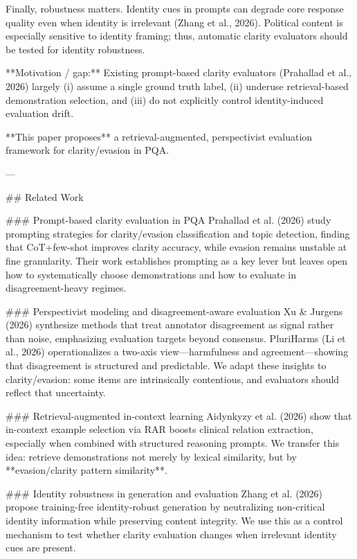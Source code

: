 Finally, robustness matters. Identity cues in prompts can degrade core response quality even when identity is irrelevant (Zhang et al., 2026). Political content is especially sensitive to identity framing; thus, automatic clarity evaluators should be tested for identity robustness.

**Motivation / gap:** Existing prompt-based clarity evaluators (Prahallad et al., 2026) largely (i) assume a single ground truth label, (ii) underuse retrieval-based demonstration selection, and (iii) do not explicitly control identity-induced evaluation drift.  

**This paper proposes** a retrieval-augmented, perspectivist evaluation framework for clarity/evasion in PQA.

---

## Related Work  

### Prompt-based clarity evaluation in PQA  
Prahallad et al. (2026) study prompting strategies for clarity/evasion classification and topic detection, finding that CoT+few-shot improves clarity accuracy, while evasion remains unstable at fine granularity. Their work establishes prompting as a key lever but leaves open how to systematically choose demonstrations and how to evaluate in disagreement-heavy regimes.

### Perspectivist modeling and disagreement-aware evaluation  
Xu & Jurgens (2026) synthesize methods that treat annotator disagreement as signal rather than noise, emphasizing evaluation targets beyond consensus. PluriHarms (Li et al., 2026) operationalizes a two-axis view—harmfulness and agreement—showing that disagreement is structured and predictable. We adapt these insights to clarity/evasion: some items are intrinsically contentious, and evaluators should reflect that uncertainty.

### Retrieval-augmented in-context learning  
Aidynkyzy et al. (2026) show that in-context example selection via RAR boosts clinical relation extraction, especially when combined with structured reasoning prompts. We transfer this idea: retrieve demonstrations not merely by lexical similarity, but by **evasion/clarity pattern similarity**.

### Identity robustness in generation and evaluation  
Zhang et al. (2026) propose training-free identity-robust generation by neutralizing non-critical identity information while preserving content integrity. We use this as a control mechanism to test whether clarity evaluation changes when irrelevant identity cues are present.

